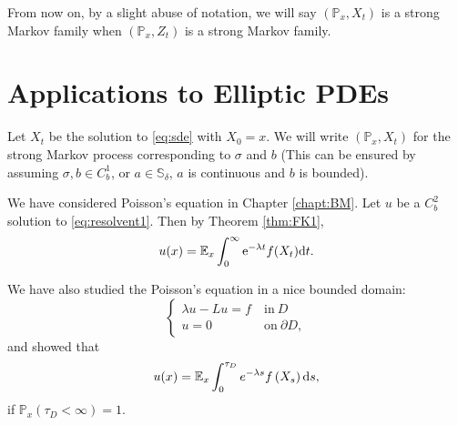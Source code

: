 \documentclass[twoside, 12pt]{book}
\numberwithin{equation}{chapter}
\def\mE{{\mathbb E}}
\def\mP{{\mathbb P}}
\def\mS{{\mathbb S}}
\def\p{\partial}
\def\d{\text{\rm{d}}}
\def\e{\mathrm{e}}
\begin{document}
	From now on, by a slight abuse of notation, we will say $(\mP_x, X_t)$ is a strong Markov family when $(\mP_x, Z_t)$ is a strong Markov family.
	
	
	
	
	
	\chapter{Applications to Elliptic PDEs}\label{chapt:pde}
	
	Let $X_t$ be the solution to \eqref{eq:sde} with $X_0=x$. We will write $\left(\mathbb{P}_x, X_t\right)$ for the strong Markov process corresponding to $\sigma$ and $b$ (This can be ensured by assuming $\sigma, b\in C^1_b$, or $a\in \mS_\delta$, $a$ is continuous and $b$ is bounded). 
	
	We have considered Poisson’s equation in Chapter \ref{chapt:BM}.   Let $u$ be a $C^2_b$ solution to  \eqref{eq:resolvent1}. Then by Theorem \ref{thm:FK1}, 
	\[
	u(x)= \mE_x \int_0^\infty \e^{-\lambda t} f(X_t) \d t. 
	\]
	
	We have also studied the Poisson’s equation in a nice bounded domain: 
	\begin{equation}\label{eq:PE}
		\begin{cases}
			\lambda u- Lu=f ~&\mbox{in}~ D\\
			u=0 ~&\mbox{on}~ \p D, 
		\end{cases}
	\end{equation}
	and showed that 
	\[
	u(x)=\mathbb{E}_x \int_0^{\tau_D} e^{-\lambda s} f\left(X_s\right) \d s, 
	\]
	if $\mP_x(\tau_D<\infty)=1$. 
	
\end{document}
